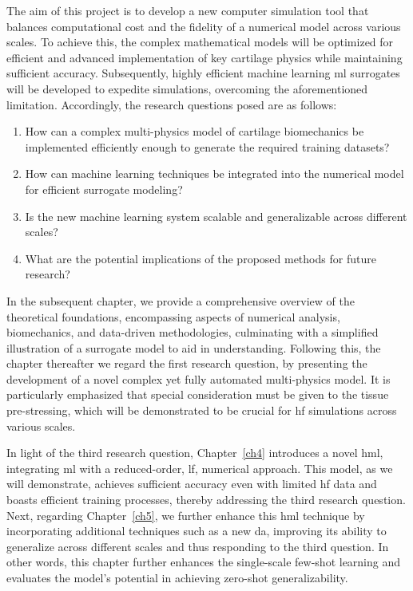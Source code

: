 The aim of this project is to develop a new computer simulation tool that balances computational cost and the fidelity of a numerical model across various scales. To achieve this, the complex mathematical models will be optimized for efficient and advanced implementation of key cartilage physics while maintaining sufficient accuracy. Subsequently, highly efficient machine learning \ac{ml} surrogates will be developed to expedite simulations, overcoming the aforementioned limitation. Accordingly, the research questions posed are as follows:
%
\begin{enumerate}
    \item How can a complex multi-physics model of cartilage biomechanics be implemented efficiently enough to generate the required training datasets?
    \item How can machine learning techniques be integrated into the numerical model for efficient surrogate modeling?
    \item Is the new machine learning system scalable and generalizable across different scales?
    \item What are the potential implications of the proposed methods for future research?
\end{enumerate}

In the subsequent chapter, we provide a comprehensive overview of the theoretical foundations, encompassing aspects of numerical analysis, biomechanics, and data-driven methodologies, culminating with a simplified illustration of a surrogate model to aid in understanding. Following this, the chapter thereafter we regard the first research question, by presenting the development of a novel complex yet fully automated multi-physics model. It is particularly emphasized that special consideration must be given to the tissue pre-stressing, which will be demonstrated to be crucial for \ac{hf} simulations across various scales.

In light of the third research question, Chapter~\ref{ch4} introduces a novel \ac{hml}, integrating \ac{ml} with a reduced-order, \ac{lf}, numerical approach. This model, as we will demonstrate, achieves sufficient accuracy even with limited \ac{hf} data and boasts efficient training processes, thereby addressing the third research question. Next, regarding Chapter~\ref{ch5}, we further enhance this \ac{hml} technique by incorporating additional techniques such as a new \ac{da}, improving its ability to generalize across different scales and thus responding to the third question. In other words, this chapter further enhances the single-scale few-shot learning and evaluates the model's potential in achieving zero-shot generalizability.

